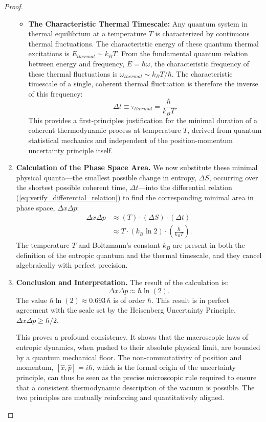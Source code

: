 \documentclass[11pt, letterpaper]{report}
\theoremstyle{plain} %
\theoremstyle{definition} %
\theoremstyle{remark} %
\begin{document}
\begin{proof}
\begin{enumerate}
\begin{itemize}
            \item \textbf{The Characteristic Thermal Timescale:} Any quantum system in thermal equilibrium at a temperature $T$ is characterized by continuous thermal fluctuations. The characteristic energy of these quantum thermal excitations is $E_{thermal} \sim k_B T$. From the fundamental quantum relation between energy and frequency, $E=\hbar\omega$, the characteristic frequency of these thermal fluctuations is $\omega_{thermal} \sim k_B T / \hbar$. The characteristic timescale of a single, coherent thermal fluctuation is therefore the inverse of this frequency:
            \begin{equation}
                \Delta t \equiv \tau_{thermal} = \frac{\hbar}{k_B T}.
            \end{equation}
            This provides a first-principles justification for the minimal duration of a coherent thermodynamic process at temperature $T$, derived from quantum statistical mechanics and independent of the position-momentum uncertainty principle itself.
        \end{itemize}

    \item \textbf{Calculation of the Phase Space Area.} We now substitute these minimal physical quanta—the smallest possible change in entropy, $\Delta S$, occurring over the shortest possible coherent time, $\Delta t$—into the differential relation (\cref{eq:verify_differential_relation}) to find the corresponding minimal area in phase space, $\Delta x\Delta p$:
    \begin{align}
        \Delta x\Delta p &\approx (T) \cdot (\Delta S) \cdot (\Delta t) \nonumber \\
        &\approx T \cdot (k_B \ln 2) \cdot \left(\frac{\hbar}{k_B T}\right).
    \end{align}
    The temperature $T$ and Boltzmann’s constant $k_B$ are present in both the definition of the entropic quantum and the thermal timescale, and they cancel algebraically with perfect precision.

    \item \textbf{Conclusion and Interpretation.} The result of the calculation is:
    \begin{equation}
        \Delta x\Delta p \approx \hbar \ln(2).
    \end{equation}
    The value $\hbar \ln(2) \approx 0.693\,\hbar$ is of order $\hbar$. This result is in perfect agreement with the scale set by the Heisenberg Uncertainty Principle, $\Delta x\Delta p \ge \hbar/2$.

    This proves a profound consistency. It shows that the macroscopic laws of entropic dynamics, when pushed to their absolute physical limit, are bounded by a quantum mechanical floor. The non-commutativity of position and momentum, $[\hat{x}, \hat{p}] = i\hbar$, which is the formal origin of the uncertainty principle, can thus be seen as the precise microscopic rule required to ensure that a consistent thermodynamic description of the vacuum is possible. The two principles are mutually reinforcing and quantitatively aligned.
\end{enumerate}
\end{proof}
\end{document}
